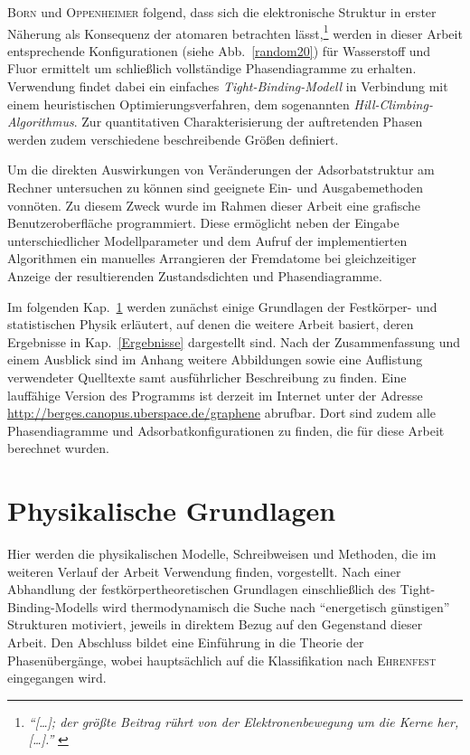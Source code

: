 \documentclass[a4paper, 10pt, twoside, openany]{book} %
\begin{document}
	\textsc{Born} und \textsc{Oppenheimer} folgend, dass sich die elektronische Struktur in erster Näherung als Konsequenz der atomaren betrachten lässt,\footnote{\emph{"`\emph{[\dots]}; der größte Beitrag rührt von der Elektronenbewegung um die Kerne her, \emph{[\dots]}."'} \cite[S.~457]{Born}} werden in dieser Arbeit entsprechende Konfigurationen (siehe Abb.~\ref{random20}) für Wasserstoff und Fluor ermittelt um schließlich vollständige Phasendiagramme zu erhalten. Verwendung findet dabei ein einfaches \emph{Tight-Binding-Modell} in Verbindung mit einem heuristischen Optimierungsverfahren, dem sogenannten \emph{Hill-Climbing-Algorithmus}. Zur quantitativen Charakterisierung der auftretenden Phasen werden zudem verschiedene beschreibende Größen definiert.
	
	Um die direkten Auswirkungen von Veränderungen der Adsorbatstruktur am Rechner untersuchen zu können sind geeignete Ein- und Ausgabemethoden vonnöten. Zu diesem Zweck wurde im Rahmen dieser Arbeit eine grafische Benutzeroberfläche programmiert. Diese ermöglicht neben der Eingabe unterschiedlicher Modellparameter und dem Aufruf der implementierten Algorithmen ein manuelles Arrangieren der Fremdatome bei gleichzeitiger Anzeige der resultierenden Zustandsdichten und Phasendiagramme.
	
	Im folgenden Kap.~\ref{Theorie} werden zunächst einige Grundlagen der Festkörper- und statistischen Physik erläutert, auf denen die weitere Arbeit basiert, deren Ergebnisse in Kap.~\ref{Ergebnisse} dargestellt sind. Nach der Zusammenfassung und einem Ausblick sind im Anhang weitere Abbildungen sowie eine Auflistung verwendeter Quelltexte samt ausführlicher Beschreibung zu finden. Eine lauffähige Version des Programms ist derzeit im Internet unter der Adresse \url{http://berges.canopus.uberspace.de/graphene} abrufbar. Dort sind zudem alle Phasendiagramme und Adsorbatkonfigurationen zu finden, die für diese Arbeit berechnet wurden.
	
    \chapter{Physikalische Grundlagen}
	\label{Theorie}
	
	Hier werden die physikalischen Modelle, Schreibweisen und Methoden, die im weiteren Verlauf der Arbeit Verwendung finden, vorgestellt. Nach einer Abhandlung der festkörpertheoretischen Grundlagen einschließlich des Tight-Binding-Modells wird thermodynamisch die Suche nach "`energetisch günstigen"' Strukturen motiviert, jeweils in direktem Bezug auf den Gegenstand dieser Arbeit. Den Abschluss bildet eine Einführung in die Theorie der Phasenübergänge, wobei hauptsächlich auf die Klassifikation nach \textsc{Ehrenfest} eingegangen wird.
	
\end{document}
